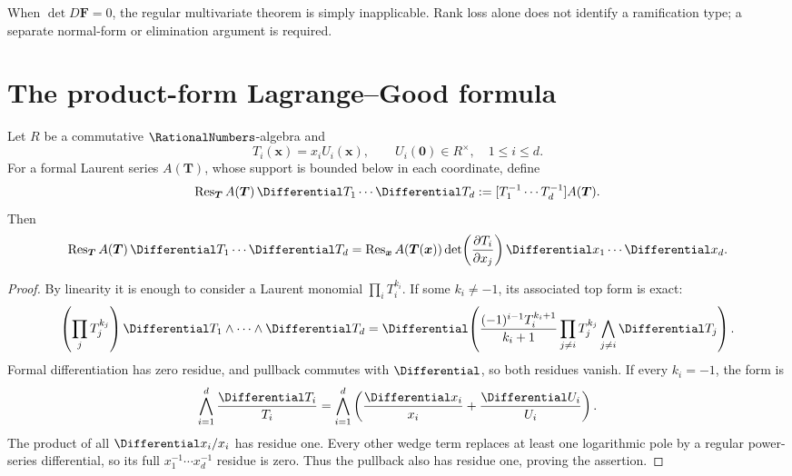 \begin{remark}
When \(\det D\bm F=0\), the regular multivariate theorem is simply
inapplicable.  Rank loss alone does not identify a ramification type; a
separate normal-form or elimination argument is required.
\end{remark}

\section{The product-form Lagrange--Good formula}
\label{sec:uq-lagrange-good}

\begin{lemma}
\label{lem:uq-multivariate-residue}
Let \(R\) be a commutative \(\RationalNumbers\)-algebra and
\[
 T_i(\bm x)=x_iU_i(\bm x),\qquad U_i(\bm0)\in R^\times,
 \quad 1\le i\le d.
\]
For a formal Laurent series \(A(\bm T)\), whose support is bounded below in
each coordinate, define
\[
 \operatorname{Res}_{\bm T}
 A(\bm T)\,\Differential T_1\cdots\Differential T_d
 :=[T_1^{-1}\cdots T_d^{-1}]A(\bm T).
\]
Then
\[
 \operatorname{Res}_{\bm T}A(\bm T)\,\Differential T_1\cdots\Differential T_d
 =
 \operatorname{Res}_{\bm x}
 A(\bm T(\bm x))
 \det\!\left(\frac{\partial T_i}{\partial x_j}\right)
 \Differential x_1\cdots\Differential x_d.
\]
\end{lemma}

\begin{proof}
By linearity it is enough to consider a Laurent monomial
\(\prod_iT_i^{k_i}\).  If some \(k_i\ne-1\), its associated top form is
exact:
\[
 \left(\prod_jT_j^{k_j}\right)
 \Differential T_1\wedge\cdots\wedge\Differential T_d
 =
 \Differential\!\left(
 \frac{(-1)^{i-1}T_i^{k_i+1}}{k_i+1}
 \prod_{j\ne i}T_j^{k_j}
 \bigwedge_{j\ne i}\Differential T_j\right).
\]
Formal differentiation has zero residue, and pullback commutes with
\(\Differential\), so both residues vanish.  If every \(k_i=-1\), the form is
\[
 \bigwedge_{i=1}^{d}\frac{\Differential T_i}{T_i}
 =
 \bigwedge_{i=1}^{d}\left(\frac{\Differential x_i}{x_i}
 +\frac{\Differential U_i}{U_i}\right).
\]
The product of all \(\Differential x_i/x_i\) has residue one.  Every other wedge term
replaces at least one logarithmic pole by a regular power-series
differential, so its full \(x_1^{-1}\cdots x_d^{-1}\) residue is zero.
Thus the pullback also has residue one, proving the assertion.
\end{proof}

